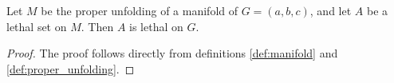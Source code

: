 \begin{cor}
\label{cor:ortho_walls}
Let $M$ be the proper unfolding of a manifold of $G = (a,b,c)$, and let $A$ be a lethal set on $M$. Then $A$ is lethal on $G$.
\end{cor}

\begin{proof}
The proof follows directly from definitions \ref{def:manifold} and \ref{def:proper_unfolding}.
\end{proof}






